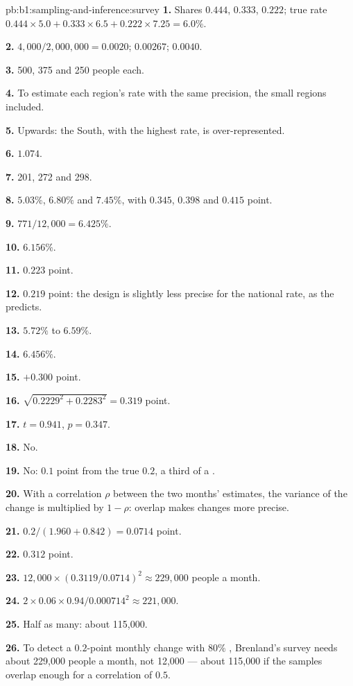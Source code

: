 \begin{solution}{pb:b1:sampling-and-inference:survey}
\textbf{1.} Shares $0.444$, $0.333$, $0.222$; true rate $0.444 \times 5.0 + 0.333 \times 6.5 + 0.222 \times 7.25 = 6.0\%$.

\textbf{2.} $4{,}000/2{,}000{,}000 = 0.0020$; $0.00267$; $0.0040$.

\textbf{3.} 500, 375 and 250 people each.

\textbf{4.} To estimate each region's rate with the same precision, the
small regions included.

\textbf{5.} Upwards: the South, with the highest rate, is over-represented.

\textbf{6.} $1.074$.

\textbf{7.} 201, 272 and 298.

\textbf{8.} $5.03\%$, $6.80\%$ and $7.45\%$, with  $0.345$, $0.398$ and $0.415$ point.

\textbf{9.} $771/12{,}000 = 6.425\%$.

\textbf{10.} $6.156\%$.

\textbf{11.} $0.223$ point.

\textbf{12.} $0.219$ point: the design is slightly less precise for the national
rate, as the  predicts.

\textbf{13.} $5.72\%$ to $6.59\%$.

\textbf{14.} $6.456\%$.

\textbf{15.} $+0.300$ point.

\textbf{16.} $\sqrt{0.2229^2 + 0.2283^2} = 0.319$ point.

\textbf{17.} $t = 0.941$, $p = 0.347$.

\textbf{18.} No.

\textbf{19.} No: $0.1$ point from the true $0.2$, a third of a .

\textbf{20.} With a correlation $\rho$ between the two months' estimates, the variance
of the change is multiplied by $1 - \rho$: overlap makes changes more precise.

\textbf{21.} $0.2/(1.960 + 0.842) = 0.0714$ point.

\textbf{22.} $0.312$ point.

\textbf{23.} $12{,}000 \times (0.3119/0.0714)^2 \approx 229{,}000$ people a month.

\textbf{24.} $2 \times 0.06 \times 0.94/0.000714^2 \approx 221{,}000$.

\textbf{25.} Half as many: about 115,000.

\textbf{26.} To detect a $0.2$-point monthly change with $80\%$ , Brenland's survey
needs about 229,000 people a month, not 12,000 --- about 115,000 if the samples
overlap enough for a correlation of $0.5$.
\end{solution}
